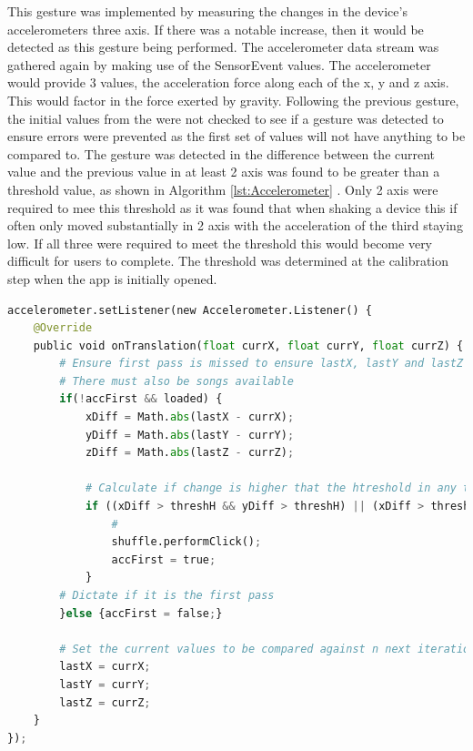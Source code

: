 \documentclass{l4proj}
\begin{document}
This gesture was implemented by measuring the changes in the device's accelerometers three axis. If there was a notable increase, then it would be detected as this gesture being performed. The accelerometer data stream was gathered again by making use of the SensorEvent values. The accelerometer would provide 3 values, the acceleration force along each of the x, y and z axis. This would factor in the force exerted by gravity. Following the previous gesture, the initial values from the were not checked to see if a gesture was detected to ensure errors were prevented as the first set of values will not have anything to be compared to. The gesture was detected in the difference between the current value and the previous value in at least 2 axis was found to be greater than a threshold value, as shown in Algorithm \ref{lst:Accelerometer} . Only 2 axis were required to mee this threshold as it was found that when shaking a device this if often only moved substantially in 2 axis with the acceleration of the third staying low. If all three were required to meet the threshold this would become very difficult for users to complete. The threshold was determined at the calibration step when the app is initially opened.

\begin{lstlisting}[language=python, float, caption={Java code detailing how the Shake Gesture is detected and how it is acted upon, this particular instance for when detection is made on the Tunes Activity.}, label=lst:Accelerometer]
accelerometer.setListener(new Accelerometer.Listener() {
    @Override
    public void onTranslation(float currX, float currY, float currZ) {
        # Ensure first pass is missed to ensure lastX, lastY and lastZ have values
        # There must also be songs available 
        if(!accFirst && loaded) {
            xDiff = Math.abs(lastX - currX);
            yDiff = Math.abs(lastY - currY);
            zDiff = Math.abs(lastZ - currZ);

            # Calculate if change is higher that the htreshold in any two axis
            if ((xDiff > threshH && yDiff > threshH) || (xDiff > threshH && zDiff > threshH) || (yDiff > threshH && zDiff > threshH)){
                # 
                shuffle.performClick();
                accFirst = true;
            }
        # Dictate if it is the first pass
        }else {accFirst = false;}

        # Set the current values to be compared against n next iteration
        lastX = currX;
        lastY = currY;
        lastZ = currZ;
    }        
});
\end{lstlisting}
\end{document}
